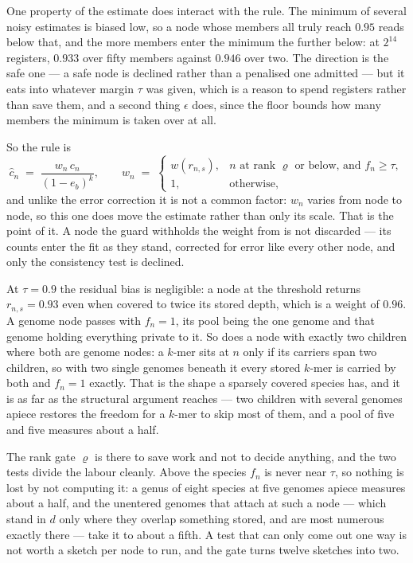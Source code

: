 \documentclass[pdflatex,sn-vancouver-num]{sn-jnl}
\begin{document}
    One property of the estimate does interact with the rule. The minimum of several noisy estimates
    is biased low, so a node whose members all truly reach $0.95$ reads below that, and the more
    members enter the minimum the further below: at $2^{14}$ registers, $0.933$ over fifty members
    against $0.946$ over two. The direction is the safe one --- a safe node is declined rather than a
    penalised one admitted --- but it eats into whatever margin $\tau$ was given, which is a reason
    to spend registers rather than save them, and a second thing $\epsilon$ does, since the floor
    bounds how many members the minimum is taken over at all.

    So the rule is
    \begin{equation}\label{smoothyweight}
        \hat{c}_n \;=\; \frac{w_n\, c_n}{(1 - e_b)^k} ,
        \qquad
        w_n \;=\;
        \begin{cases}
            w(r_{n,s}) , & \text{$n$ at rank $\varrho$ or below, and } f_n \geq \tau , \\
            1 , & \text{otherwise} ,
        \end{cases}
    \end{equation}
    and unlike the error correction it is not a common factor: $w_n$ varies from node to node, so
    this one does move the estimate rather than only its scale. That is the point of it. A node the
    guard withholds the weight from is not discarded --- its counts enter the fit as they stand,
    corrected for error like every other node, and only the consistency test is declined.

    At $\tau = 0.9$ the residual bias is negligible: a node at the threshold returns
    $r_{n,s} = 0.93$ even when covered to twice its stored depth, which is a weight of $0.96$. A
    genome node passes with $f_n = 1$, its pool being the one genome and that genome holding
    everything private to it. So does a node with exactly two children where both are genome nodes:
    a $k$-mer sits at $n$ only if its carriers span two children, so with two single genomes beneath
    it every stored $k$-mer is carried by both and $f_n = 1$ exactly. That is the shape a sparsely
    covered species has, and it is as far as the structural argument reaches --- two children with
    several genomes apiece restores the freedom for a $k$-mer to skip most of them, and a pool of
    five and five measures about a half.

    The rank gate $\varrho$ is there to save work and not to decide anything, and the two tests
    divide the labour cleanly. Above the species $f_n$ is never near $\tau$, so nothing is lost by
    not computing it: a genus of eight species at five genomes apiece measures about a half, and the
    unentered genomes that attach at such a node --- which stand in $d$ only where they overlap
    something stored, and are most numerous exactly there --- take it to about a fifth. A test that
    can only come out one way is not worth a sketch per node to run, and the gate turns twelve
    sketches into two.
\end{document}
